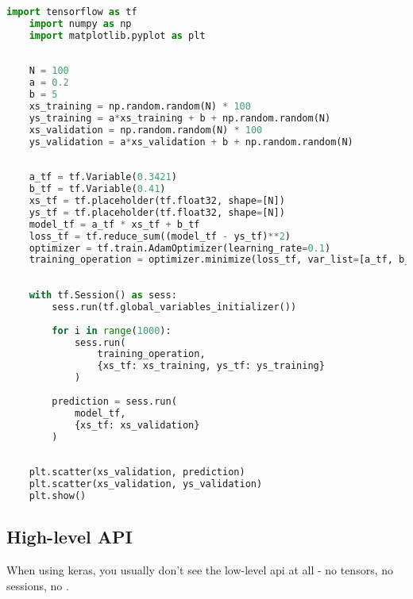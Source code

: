 \begin{lstlisting}[language=python]
    import tensorflow as tf
    import numpy as np
    import matplotlib.pyplot as plt
    
    
    N = 100
    a = 0.2
    b = 5
    xs_training = np.random.random(N) * 100
    ys_training = a*xs_training + b + np.random.random(N)
    xs_validation = np.random.random(N) * 100
    ys_validation = a*xs_validation + b + np.random.random(N)
    
    
    a_tf = tf.Variable(0.3421)
    b_tf = tf.Variable(0.41)
    xs_tf = tf.placeholder(tf.float32, shape=[N])
    ys_tf = tf.placeholder(tf.float32, shape=[N])
    model_tf = a_tf * xs_tf + b_tf
    loss_tf = tf.reduce_sum((model_tf - ys_tf)**2)
    optimizer = tf.train.AdamOptimizer(learning_rate=0.1)
    training_operation = optimizer.minimize(loss_tf, var_list=[a_tf, b_tf])
    
    
    with tf.Session() as sess:
        sess.run(tf.global_variables_initializer())
    
        for i in range(1000):
            sess.run(
                training_operation, 
                {xs_tf: xs_training, ys_tf: ys_training}
            )
    
        prediction = sess.run(
            model_tf, 
            {xs_tf: xs_validation}
        )
    
    
    plt.scatter(xs_validation, prediction)
    plt.scatter(xs_validation, ys_validation)
    plt.show()

\end{lstlisting}

\subsection{High-level API}

When using keras, you usually don't see the low-level api at all - no tensors, no sessions, no .

